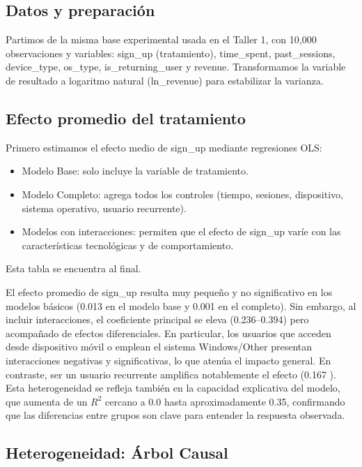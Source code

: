 \documentclass[conference]{IEEEtran}
\begin{document}
\subsection{Datos y preparación}

Partimos de la misma base experimental usada en el Taller 1, con 10,000 observaciones y variables:
sign\_up (tratamiento), time\_spent, past\_sessions, device\_type, os\_type, is\_returning\_user y revenue.
Transformamos la variable de resultado a logaritmo natural (ln\_revenue) para estabilizar la varianza.


\subsection{Efecto promedio del tratamiento}

Primero estimamos el efecto medio de sign\_up mediante regresiones OLS:

\begin{itemize}
  \item Modelo Base: solo incluye la variable de tratamiento.
  \item Modelo Completo: agrega todos los controles (tiempo, sesiones, dispositivo, sistema operativo, usuario recurrente).
  \item Modelos con interacciones: permiten que el efecto de sign\_up varíe con las características tecnológicas y de comportamiento.
\end{itemize}

Esta tabla se encuentra al final.

El efecto promedio de sign\_up resulta muy pequeño y no significativo en los modelos básicos (0.013 en el modelo base y 0.001 en el completo). Sin embargo, al incluir interacciones, el coeficiente principal se eleva (0.236–0.394) pero acompañado de efectos diferenciales. En particular, los usuarios que acceden desde dispositivo móvil o emplean el sistema Windows/Other presentan interacciones negativas y significativas, lo que atenúa el impacto general. En contraste, ser un usuario recurrente amplifica notablemente el efecto (0.167 \*\*\*). Esta heterogeneidad se refleja también en la capacidad explicativa del modelo, que aumenta de un $R^2$ cercano a 0.0 hasta aproximadamente 0.35, confirmando que las diferencias entre grupos son clave para entender la respuesta observada.


\subsection{Heterogeneidad: Árbol Causal}
\end{document}
